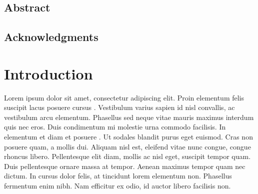 \documentclass{silreport}
\begin{document}
\maketitle

\onehalfspacing

\section*{Abstract}
\lipsum[1-2]
\cleardoublepage


\section*{Acknowledgments}
\lipsum[1]
\cleardoublepage

\begingroup
\singlespacing
\makeatletter
\def\@makeschapterhead#1{%
  {\parindent \z@ \raggedright
    \normalfont
    \interlinepenalty\@M
    \Huge \bfseries  #1\par\nobreak
    \vskip 40\p@
  }}
\makeatother

\tableofcontents
\listoffigures
\listoftables
\cleardoublepage
\endgroup
  
\setcounter{page}{1}


\chapter{Introduction}
Lorem ipsum dolor sit amet, consectetur adipiscing elit. Proin elementum felis suscipit lacus posuere cursus \cite{aws_sam}. Vestibulum varius sapien id nisl convallis, ac vestibulum arcu elementum. Phasellus sed neque vitae mauris maximus interdum quis nec eros. Duis condimentum mi molestie urna commodo facilisis. In elementum et diam et posuere \cite{Cahn:etal:2015}. Ut sodales blandit purus eget euismod. Cras non posuere quam, a mollis dui. Aliquam nisl est, eleifend vitae nunc congue, congue rhoncus libero. Pellentesque elit diam, mollis ac nisl eget, suscipit tempor quam. Duis pellentesque ornare massa at tempor. Aenean maximus tempor quam nec dictum. In cursus dolor felis, at tincidunt lorem elementum non. Phasellus fermentum enim nibh. Nam efficitur ex odio, id auctor libero facilisis non.
\end{document}
